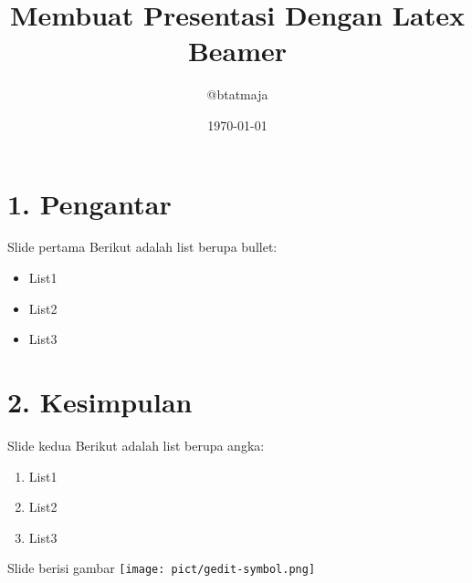 \documentclass{beamer}
\title{Membuat Presentasi Dengan Latex Beamer}
\author{@btatmaja}
\date{\today}
\begin{document}
	\frame{\titlepage}
	
\section {1. Pengantar}
\begin{frame}[t, fragile]{Slide pertama}
Berikut adalah list berupa bullet:
\begin{itemize}
\item List1
\item List2
\item List3
\end{itemize}
\end{frame}

\section{2. Kesimpulan}
\begin{frame}[t, fragile]{Slide kedua}
Berikut adalah list berupa angka:
\begin{enumerate}
\item List1
\item List2
\item List3
\end{enumerate}
\end{frame}

\begin{frame}[t, fragile]{Slide berisi gambar}
\texttt{[image: pict/gedit-symbol.png]}
\end{frame}
\end{document}
